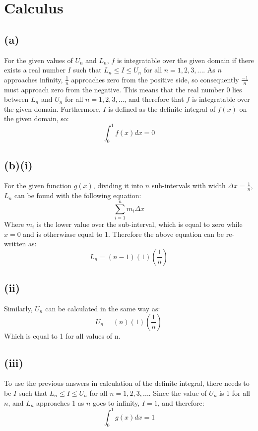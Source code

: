\documentclass[11pt]{article}
\begin{document}
\section*{Calculus}
\subsection*{(a)}
For the given values of $U_n$ and $L_n$, $f$ is integratable over the given domain if there exists a real number $I$ such that $L_n \leq I \leq U_n$ for all $n = 1,2,3,...$. As $n$ approaches infinity, $\frac{1}{n}$ approaches zero from the positive side, so consequently $\frac{-1}{n}$ must approach zero from the negative. This means that the real number 0 lies between $L_n$ and $U_n$ for all $n=1,2,3,...$, and therefore that $f$ is integratable over the given domain. Furthermore, $I$ is defined as the definite integral of $f(x)$ on the given domain, so:
$$\int_{0}^{1} f(x) dx = 0$$
\subsection*{(b)(i)}
For the given function $g(x)$, dividing it into $n$ sub-intervals with width $\Delta x=\frac{1}{n}$, $L_n$ can be found with the following equation:
$$\sum_{i=1}^{n} m_i \Delta x$$
Where $m_i$ is the lower value over the sub-interval, which is equal to zero while $x=0$ and is otherwiase equal to 1. Therefore the above equation can be re-written as: 
$$L_n=(n - 1) (1)(\frac{1}{n})$$ 
\subsection*{(ii)}
Similarly, $U_n$ can be calculated in the same way as:
$$U_n=(n)(1)(\frac{1}{n})$$
Which is equal to 1 for all values of n.
\subsection*{(iii)}
To use the previous answers in calculation of the definite integral, there needs to be $I$ such that $L_n \leq I \leq U_n$ for all $n = 1,2,3,...$. Since the value of $U_n$ is 1 for all $n$, and $L_n$ approaches 1 as $n$ goes to infinity, $I=1$, and therefore:
$$\int_{0}^{1} g(x) dx = 1$$
\end{document}
